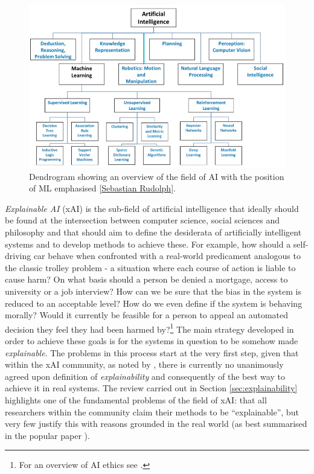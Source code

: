  \begin{figure}[htbp]
\centerline{\includegraphics[width=\textwidth]{introduction/images/ai-overview}}
\caption{Dendrogram showing an overview of the field of AI with the position of ML emphasised [\href{https://tu-dresden.de/ing/informatik/ressourcen/dateien/studium/lehrangebot/forschungslinie_einfuehrung_in_die_forschung/2017/2017-04-03-FG-KI.pdf}{Sebastian Rudolph}].}
\label{fig:ai-overview}
\end{figure}

\textit{Explainable AI} (xAI) is the sub-field of artificial intelligence that ideally should be found at the intersection between computer science, social sciences and philosophy and that should aim to define the desiderata of artificially intelligent systems and to develop methods to achieve these.
For example, how should a self-driving car behave when confronted with a real-world predicament analogous to the classic trolley problem - a situation where each course of action is liable to cause harm?  
On what basis should a person be denied a mortgage, access to university or a job interview?  How can we be sure that the bias in the system is reduced to an acceptable level?  How do we even define if the system is behaving morally?  Would it currently be feasible for a person  to appeal an automated decision they feel they had been harmed by?\footnote{For an overview of AI ethics see \citet{Bostrom2011}.}
The main strategy developed in order to achieve these goals is for the systems in question to be somehow made \textit{explainable}. 
The problems in this process start at the very first step, given that within the xAI community, as noted by \citet{Doran2018}, there is currently no unanimously agreed upon definition of \textit{explainability} and consequently of the best way to achieve it in real systems.
The review carried out in Section \ref{sec:explainability} highlights one of the fundamental problems of the field of xAI: that all researchers within the community claim their methods to be \enquote{explainable}, but very few justify this with reasons grounded in the real world (as best summarised in the popular paper \citep{Lipton2016}).

